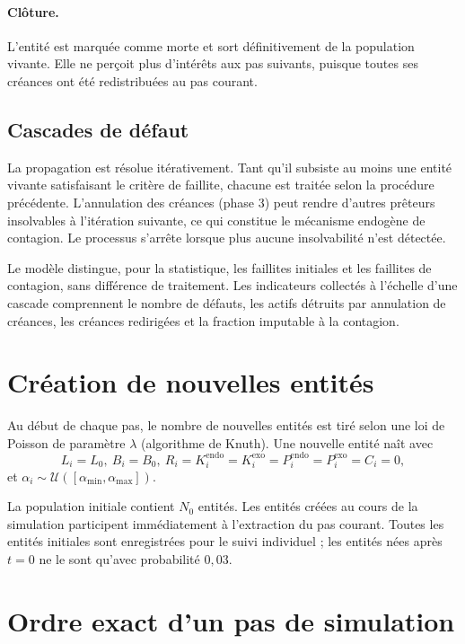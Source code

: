 \documentclass[11pt,a4paper]{article}
\begin{document}
\paragraph{Clôture.} L'entité est marquée comme morte et sort définitivement de la population vivante. Elle ne perçoit plus d'intérêts aux pas suivants, puisque toutes ses créances ont été redistribuées au pas courant.

\subsection{Cascades de défaut}

La propagation est résolue itérativement. Tant qu'il subsiste au moins une entité vivante satisfaisant le critère de faillite, chacune est traitée selon la procédure précédente. L'annulation des créances (phase 3) peut rendre d'autres prêteurs insolvables à l'itération suivante, ce qui constitue le mécanisme endogène de contagion. Le processus s'arrête lorsque plus aucune insolvabilité n'est détectée.

Le modèle distingue, pour la statistique, les faillites initiales et les faillites de contagion, sans différence de traitement. Les indicateurs collectés à l'échelle d'une cascade comprennent le nombre de défauts, les actifs détruits par annulation de créances, les créances redirigées et la fraction imputable à la contagion.

\section{Création de nouvelles entités}

Au début de chaque pas, le nombre de nouvelles entités est tiré selon une loi de Poisson de paramètre \(\lambda\) (algorithme de Knuth). Une nouvelle entité naît avec
\[
L_i = L_0,\ B_i = B_0,\ R_i = K_i^{\mathrm{endo}} = K_i^{\mathrm{exo}} = P_i^{\mathrm{endo}} = P_i^{\mathrm{exo}} = C_i = 0,
\]
et \(\alpha_i\sim\mathcal U([\alpha_{\min},\alpha_{\max}])\).

La population initiale contient \(N_0\) entités. Les entités créées au cours de la simulation participent immédiatement à l'extraction du pas courant. Toutes les entités initiales sont enregistrées pour le suivi individuel ; les entités nées après \(t=0\) ne le sont qu'avec probabilité \(0{,}03\).

\section{Ordre exact d'un pas de simulation}
\end{document}
